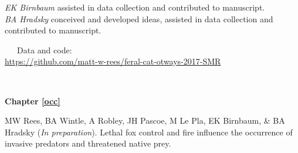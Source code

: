 \documentclass[11pt,a4paper,titlepage,twoside,openright]{style/unimelbthesis}
\begin{document}
\begin{frontmatter}
\begin{preface}
    \hspace*{0.333em}\hspace*{0.333em}\hspace*{0.333em}\hspace*{0.333em}\hspace*{0.333em}\hspace*{0.333em}\hspace*{0.333em}\hspace*{0.333em}\emph{EK Birnbaum} assisted in data collection and contributed to manuscript.\\
    \hspace*{0.333em}\hspace*{0.333em}\hspace*{0.333em}\hspace*{0.333em}\hspace*{0.333em}\hspace*{0.333em}\hspace*{0.333em}\hspace*{0.333em}\emph{BA Hradsky} conceived and developed ideas, assisted in data collection and contributed to manuscript.
    
    ~~~Data and code:\\
    \url{https://github.com/matt-w-rees/feral-cat-otways-2017-SMR}
    
    \(~\)
    
    \textbf{Chapter \ref{occ}}
    
    MW Rees, BA Wintle, A Robley, JH Pascoe, M Le Pla, EK Birnbaum, \& BA Hradsky (\emph{In preparation}). Lethal fox control and fire influence the occurrence of invasive predators and threatened native prey.
    

\end{preface}
\end{frontmatter}
\end{document}
